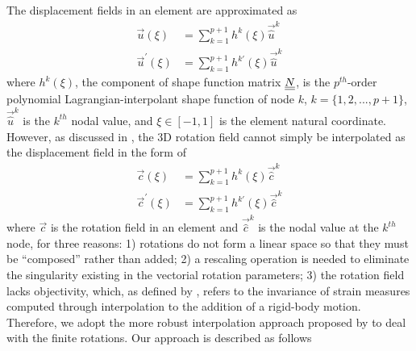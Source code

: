 The displacement fields in an element are approximated as
\begin{align}
    \label{InterpolateDisp}
    \vec{u}(\xi) &= \sum_{k=1}^{p+1} h^k(\xi) \vec{\hat{u}}^k \\
    \label{InterpolateDispp}
    \vec{u}^\prime(\xi) &= \sum_{k=1}^{p+1} h^{k\prime}(\xi) \vec{\hat{u}}^k
\end{align}
where $h^k(\xi)$, the component of shape function matrix $\underline{\underline{N}}$, is the $p^{th}$-order polynomial Lagrangian-interpolant shape function of node $k$, $k=\{1,2,...,p+1\}$, $\vec{\hat{u}}^k$ is the $k^{th}$ nodal value, and $\xi \in \left[-1,1\right]$ is the element natural coordinate.
However, as discussed in \cite{Bauchau-etal:2008}, the 3D rotation field cannot simply be interpolated as the displacement field in the form of
\begin{align}
    \label{InterpolateRot}
    \vec{c}(\xi) &= \sum_{k=1}^{p+1} h^k(\xi) \vec{\hat{c}}^k \\
    \label{InterpolateRotp}
    \vec{c}^\prime(\xi) &= \sum_{k=1}^{p+1} h^{k \prime}(\xi) \vec{\hat{c}}^k 
\end{align}    
where $\vec{c}$ is the rotation field in an element and $\vec{\hat{c}}^k$ is the nodal value at the $k^{th}$ node, for three reasons: 1) rotations do not form a linear space so that they must be  ``composed'' rather than added; 2) a rescaling operation is needed to eliminate the singularity existing in the vectorial rotation parameters; 3) the rotation field lacks objectivity, which, as defined by \cite{Crisfield1999}, refers to the invariance of strain measures computed through interpolation to the addition of a rigid-body motion. 
Therefore, we adopt the more robust interpolation approach proposed by \cite{Crisfield1999} to deal with the finite rotations. Our approach is described as follows
